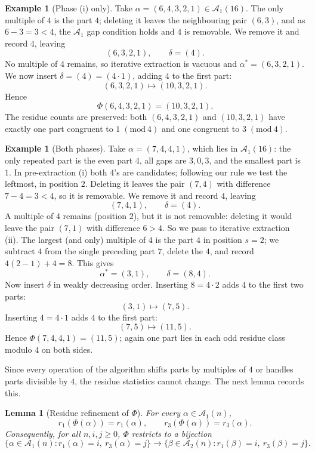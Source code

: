 \documentclass[11pt]{amsart}
\newtheorem{lemma}[theorem]{Lemma}
\theoremstyle{definition}
\newtheorem{example}[theorem]{Example}
\theoremstyle{remark}
\newcommand{\Aone}{\mathcal A_1}
\newcommand{\Atwo}{\mathcal A_2}
\newcommand{\modulo}[1]{\;(\mathrm{mod}\ #1)}
\begin{document}
\begin{example}[Phase (i) only]\label{ex:Phi1}
Take \(\alpha=(6,4,3,2,1)\in\Aone(16)\). The only multiple of $4$ is the part $4$; deleting it leaves the neighbouring pair $(6,3)$, and as $6-3=3<4$, the $\Aone$ gap condition holds and $4$ is removable. We remove it and record $4$, leaving $$(6,3,2,1),\qquad \delta=(4).$$
No multiple of \(4\) remains, so iterative extraction is vacuous and
\(\alpha^\ast=(6,3,2,1)\). We now insert \(\delta=(4)=(4\cdot 1)\), adding \(4\) to
the first part:
\[
   (6,3,2,1)\longmapsto(10,3,2,1).
\]
Hence $$\Phi(6,4,3,2,1)=(10,3,2,1).$$
The residue counts are preserved: both \((6,4,3,2,1)\) and \((10,3,2,1)\) have
exactly one part congruent to \(1\modulo 4\) and one congruent to \(3\modulo 4\).
\end{example}

\begin{example}[Both phases]\label{ex:Phi2}
Take \(\alpha=(7,4,4,1)\), which lies in $\Aone(16)$: the only repeated part is the even part $4$, all gaps are $3,0,3$, and the smallest part is $1$. In pre-extraction (i) both $4$'s are candidates; following our rule we test the leftmost, in position $2$. Deleting it leaves the pair $(7,4)$ with difference $7-4=3<4$, so it is removable. We remove it and record $4$, leaving
\[
   (7,4,1),\qquad \delta=(4).
\]
A multiple of \(4\) remains (position \(2\)), but it is not removable:
deleting it would leave the pair \((7,1)\) with difference \(6>4\). So we
pass to iterative extraction (ii). The largest (and only) multiple of \(4\) is the
part \(4\) in position \(s=2\); we subtract \(4\) from the single preceding part
\(7\), delete the \(4\), and record \(4(2-1)+4=8\). This gives
\[
   \alpha^\ast=(3,1),\qquad \delta=(8,4).
\]
Now insert \(\delta\) in weakly decreasing order. Inserting \(8=4\cdot2\) adds \(4\) to the
first two parts:
\[
   (3,1)\longmapsto(7,5).
\]
Inserting \(4=4\cdot1\) adds \(4\) to the first part:
\[
   (7,5)\longmapsto(11,5).
\]
Hence $\Phi(7,4,4,1)=(11,5)$; again one part lies in each odd residue class modulo $4$ on both sides.
\end{example}

Since every operation of the algorithm shifts parts by multiples of $4$ or handles parts divisible by $4$, the residue statistics cannot change. The next lemma records this.

\begin{lemma}[Residue refinement of \(\Phi\)]\label{lem:Phi}
For every \(\alpha\in\Aone(n)\),
\[
   r_1(\Phi(\alpha))=r_1(\alpha),\qquad
   r_3(\Phi(\alpha))=r_3(\alpha).
\]
Consequently, for all \(n,i,j\ge 0\), \(\Phi\) restricts to a bijection
\[
   \{\alpha\in\Aone(n):r_1(\alpha)=i,\ r_3(\alpha)=j\}
   \longrightarrow
   \{\beta\in\Atwo(n):r_1(\beta)=i,\ r_3(\beta)=j\}.
\]
\end{lemma}
\end{document}
